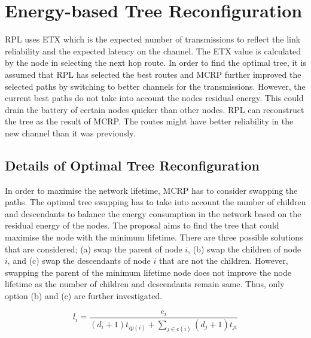 \section{Energy-based Tree Reconfiguration}
\label{OptimalTree}

RPL uses ETX which is the expected number of transmissions to reflect the link reliability and the expected latency on the channel. The ETX value is calculated by the node in selecting the next hop route. In order to find the optimal tree, it is assumed that RPL has selected the best routes and MCRP further improved the selected paths by switching to better channels for the transmissions. However, the current best paths do not take into account the nodes residual energy. This could drain the battery of certain nodes quicker than other nodes. RPL can reconstruct the tree as the result of MCRP. The routes might have better reliability in the new channel than it was previously.


\subsection{Details of Optimal Tree Reconfiguration}

In order to maximise the network lifetime, MCRP has to consider swapping the paths. The optimal tree swapping has to take into account the number of children and descendants to balance the energy consumption in the network based on the residual energy of the nodes. 
The proposal aims to find the tree that could maximise the node with the minimum lifetime. There are three possible solutions that are considered; (a) swap the parent of node $i$, (b) swap the children of node $i$, and (c) swap the descendants of node $i$ that are not the children. However, swapping the parent of the minimum lifetime node does not improve the node lifetime as the number of children and descendants remain same. Thus, only option (b) and (c) are further investigated.  

\begin{equation}
l_i = \frac{e_i}{{(d_i + 1)t_{ip(i)} + \sum_{j \in c(i)} (d_j + 1)t_{ji}}}
\label{optimalEq}
\end{equation}

